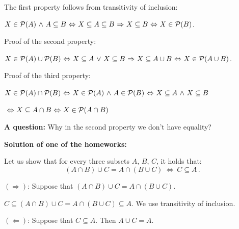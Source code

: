 \documentclass[11pt,paper=b5,footinclude,headinclude]{scrbook} %
\def\P {{\cal P}}
\def\ali {{~\vee~}}
\def\inn {{~\wedge~}}
\def\sledi {{~\Rightarrow~}}
\def\cee {{~\Leftrightarrow~}}
\theoremstyle{remark}
\theoremstyle{definition} %
\theoremstyle{theorem} %
\begin{document}
The first property follows from transitivity of inclusion:

$X\in \P(A) \inn A\subseteq B\cee X\subseteq A\subseteq B\sledi X\subseteq B\cee X\in \P(B)$.

Proof of the second property:

$X\in \P(A) \cup \P(B) \cee X\subseteq A\ali X\subseteq B\sledi X\subseteq A\cup B\cee X\in \P(A\cup B)$.

Proof of the third property:

$X\in \P(A)\cap \P(B)\cee X\in \P(A) \inn A\in \P(B)\cee X\subseteq A \inn X\subseteq B$

$\cee X\subseteq A \cap B\cee X\in \P(A\cap B)$

%

\textbf{ A question:} Why in the second property we don't have equality?



\bigskip

%
%
%
%
%
%
%
%
%
%
%
%
%

\textbf{ Solution of one of the homeworks:}

Let us show that for every three subsets $A$, $B$, $C$, it holds that:
$$(A\cap B)\cup C = A\cap (B\cup C) \cee C\subseteq A\,.$$

\medskip
$(\Rightarrow)$:
Suppose that $(A\cap B)\cup C = A\cap (B\cup C)$.

$C\subseteq (A\cap B)\cup C = A\cap (B\cup C)\subseteq A$. We use transitivity of inclusion.

\medskip
$(\Leftarrow)$:
Suppose that $C\subseteq A$. Then $A\cup C = A$.
\end{document}

